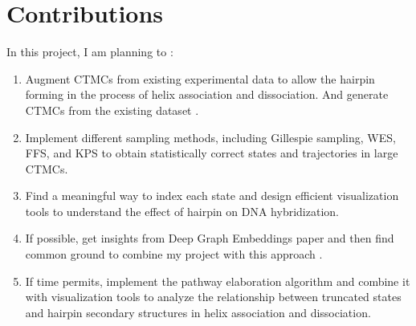 \documentclass{article}
\begin{document}
\section{Contributions}

In this project, I am planning to :
\begin{enumerate}
	\item Augment CTMCs from existing experimental data to allow the hairpin forming in the process of helix association and dissociation. And generate CTMCs from the existing dataset \cite{schreck}.
	\item Implement different sampling methods, including Gillespie sampling, WES, FFS, and KPS to obtain statistically correct states and trajectories in large CTMCs.   
	\item Find a meaningful way to index each state and design efficient visualization tools to understand the effect of hairpin on DNA hybridization.
	\item If possible, get insights from Deep Graph Embeddings paper and then find common ground to combine my project with this approach \cite{deepgraph}.
	\item If time permits, implement the pathway elaboration algorithm \cite{PE} and combine it with visualization tools to analyze the relationship between truncated states and hairpin secondary structures in helix association and dissociation.
\end{enumerate}

\clearpage

{}
\end{document}
